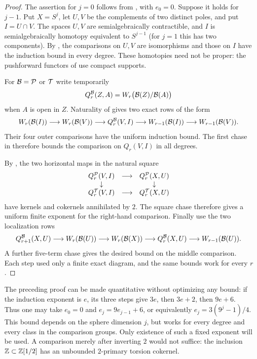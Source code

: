 \begin{proof}
The assertion for $j=0$ follows from , with
$e_0=0$.  Suppose it holds for $j-1$.  Put $X=S^j$, let $U,V$
be the complements of two distinct poles, and put $I=U\cap V$.
The spaces $U,V$ are semialgebraically contractible, and $I$ is
semialgebraically homotopy equivalent to $S^{j-1}$ (for $j=1$ this
has two components).  By , the comparisons on
$U,V$ are isomorphisms and those on $I$ have the induction bound
in every degree.  These homotopies need not be proper: the
pushforward functors of  use compact
supports.

For $\mathcal B=\mathcal P$ or $\mathcal T$ write temporarily
\[
 Q_r^{\mathcal B}(Z,A)=W_r\bigl(\mathcal B(Z)/\mathcal B(A)\bigr)
\]
when $A$ is open in $Z$.  Naturality of
 gives two exact rows of the form
\[
 W_r(\mathcal B(I))\longrightarrow W_r(\mathcal B(V))
 \longrightarrow Q_r^{\mathcal B}(V,I)
 \longrightarrow W_{r-1}(\mathcal B(I))
 \longrightarrow W_{r-1}(\mathcal B(V)).
\]
Their four outer comparisons have the uniform induction bound.
The first chase in  therefore bounds the
comparison on $Q_r(V,I)$ in all degrees.

By , the two horizontal maps
in the natural square
\[
\begin{array}{ccc}
 Q_r^{\mathcal P}(V,I)&\longrightarrow&Q_r^{\mathcal P}(X,U)\\
 \downarrow&&\downarrow\\
 Q_r^{\mathcal T}(V,I)&\longrightarrow&Q_r^{\mathcal T}(X,U)
\end{array}
\]
have kernels and cokernels annihilated by $2$.  The square chase
therefore gives a uniform finite exponent for the right-hand
comparison.  Finally use the two localization rows
\[
 Q_{r+1}^{\mathcal B}(X,U)\longrightarrow W_r(\mathcal B(U))
 \longrightarrow W_r(\mathcal B(X))
 \longrightarrow Q_r^{\mathcal B}(X,U)
 \longrightarrow W_{r-1}(\mathcal B(U)).
\]
A further five-term chase gives the desired bound on the middle
comparison.  Each step used only a finite exact diagram, and the
same bounds work for every $r$.
\end{proof}

\begin{remark}
\label{lat:exponent-bookkeeping}
The preceding proof can be made quantitative without optimizing any
bound: if the induction exponent is $e$, its three steps give
$3e$, then $3e+2$, then $9e+6$.  Thus one may take
$e_0=0$ and $e_j=9e_{j-1}+6$, or equivalently
$e_j=3(9^j-1)/4$.  This bound depends on the sphere dimension $j$,
but works for every degree and every class in the comparison groups.
Only existence of such a fixed exponent will be used.
A comparison merely after inverting $2$ would not
suffice: the inclusion $\mathbb Z\subset\mathbb Z[1/2]$ has an unbounded
$2$-primary torsion cokernel.
\end{remark}

